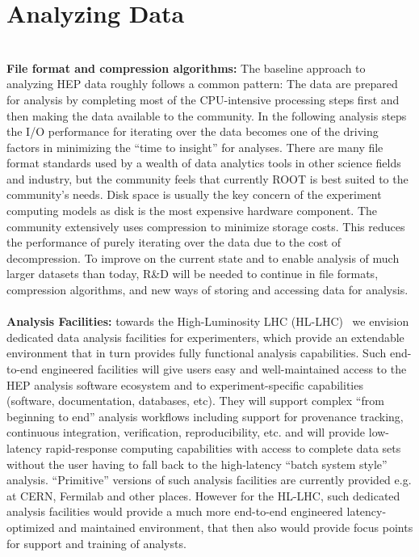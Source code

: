 \documentclass[12pt,a4paper]{article}
\begin{document}
\section{Analyzing Data}~\\
{\bf File format and compression algorithms:} The baseline approach to analyzing HEP data roughly follows a common pattern: The data are prepared for analysis by completing most of the CPU-intensive processing steps first and then making the data available to the community. In the following analysis steps the I/O performance for iterating over the data becomes one of the driving factors in minimizing the ``time to insight'' for analyses. There are many file format standards used by a wealth of data analytics tools in other science fields and industry, but the community feels that currently ROOT is best suited to the community's needs. Disk space is usually the key concern of the experiment computing models as disk is the most expensive hardware component. The community extensively uses compression to minimize storage costs. This reduces the performance of purely iterating over the data due to the cost of decompression. To improve on the current state and to enable analysis of much larger datasets than today, R\&D will be needed to continue in file formats, compression algorithms, and new ways of storing and accessing data for analysis. \\ \\
{\bf Analysis Facilities:} towards the High-Luminosity LHC (HL-LHC)~\cite{Apollinari:2284929} we envision dedicated data analysis facilities for experimenters, which provide an extendable environment that in turn provides fully functional analysis capabilities. Such end-to-end engineered facilities will give users easy and well-maintained access to the HEP analysis software ecosystem and to experiment-specific capabilities (software, documentation, databases, etc). They will support complex ``from beginning to end'' analysis workflows including support for provenance tracking, continuous integration, verification, reproducibility, etc. and will provide low-latency rapid-response computing capabilities with access to complete data sets without the user having to fall back to the high-latency ``batch system style'' analysis. ``Primitive'' versions of such analysis facilities are currently provided e.g. at CERN, Fermilab and other places. However for the HL-LHC, such dedicated analysis facilities would provide a much more end-to-end engineered latency-optimized and maintained environment, that then also would provide focus points for support and training of analysts.\\ \\
\end{document}
